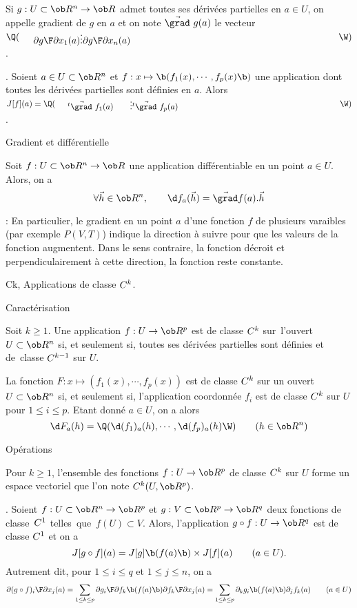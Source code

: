\Definition []  Si $g:U\subset\ob R^n\to\ob R$ admet toutes ses dérivées partielles en $a\in U$, 
on appelle gradient de $g$ en $a$ et on note $\vec{\grad}\ g(a)$ 
le vecteur $\Q(\vcenter{\mbox{${\partial g\F\partial x_1}(a)$}\mbox{$\vdots$}\mbox{${\partial g\F\partial x_n}(a)$}}\W)$. 
\bigskip

\Remarque. Soient $a\in U\subset\ob R^n$ et $f:x\mapsto\b(f_1(x),\cdots, f_p(x)\b)$ une application 
dont toutes les dérivées partielles sont définies en $a$. 
Alors $J[f](a)=\Q(\vcenter{\mbox{$\null^t\vec{\grad}\ f_1(a)$}\mbox{\qquad$\vdots$}\mbox{$\null^t\vec{\grad}\ f_p(a)$}}\W)$. 
\medskip

\Concept [] Gradient et différentielle

\Propriete []  Soit $f:U\subset \ob R^n\to\ob R$ une application différentiable en un point $a\in U$. Alors, on a 
$$
\forall \vec h\in\ob R^n, \qquad \d f_a(\vec h)=\vec{\grad}f(a).\vec h
$$

\Remarque : En particulier, le gradient en un point $a$ d'une fonction $f$ de plusieurs varaibles (par exemple $P(V,T)$) indique la direction à suivre pour que les valeurs de la fonction augmentent. Dans le sens contraire, la fonction décroit et perpendiculairement à cette direction, la fonction reste constante. 
\bigskip

\Subsection Ck, Applications de classe $\sc C^k$.

\Concept [] Caractérisation

\Definition []  Soit $k\ge1$. Une application $f:U\to\ob R^p$ est de classe $\sc C^k$ 
sur~l'ouvert $U\subset\ob R^n$ si, et seulement si, toutes ses dérivées partielles 
sont définies et de~classe $\sc C^{k-1}$ sur $U$. 
\bigskip


\Propriete []  La fonction $F:x\mapsto(f_1(x),\cdots,f_p(x))$ est de classe $\sc C^k$ sur un ouvert $U\subset\ob R^n$ si, et seulement si, 
l'application coordonnée $f_i$ est de classe $\sc C^k$ sur $U$ pour $1\le i\le p$. 
Etant donné $a\in U$, on a alors 
$$
	\d F_a(h)=\Q(\d(f_1)_a(h),\cdots,\d(f_p)_a(h)\W)\qquad(h\in\ob R^n)
$$ 

\Concept [] Opérations

\Propriete []  Pour $k\ge1$, l'ensemble des fonctions $f:U\to\ob R^p$ 
de classe $\sc C^k$ sur $U$ forme un espace vectoriel que l'on note $\sc C^k(U,\ob R^p)$. 
\bigskip

\Theoreme . Soient $f:U\subset\ob R^n\to\ob R^p$ et $g:V\subset\ob R^p\to\ob R^q$ 
deux fonctions de classe~$\sc C^1$ telles~que~$f(U)\subset V$. Alors, l'application $g\circ f:U\to\ob R^q$ 
est de classe $\sc C^1$ et on a 
$$
J[g\circ f](a)=J[g]\b(f(a)\b)\times J[f](a)\qquad(a\in U). 
$$ 
Autrement dit, pour $1\le i\le q$ et $1\le j\le n$, on a 
$$
{\partial (g\circ f)_i\F\partial x_j}(a)=\sum_{1\le k\le p}{\partial g_i\F\partial f_k}\b(f(a)\b){\partial f_k\F\partial x_j}(a)
=\sum_{1\le k\le p}\partial_k g_i\b(f(a)\b)\partial_j f_k(a)\qquad(a\in U)
$$

